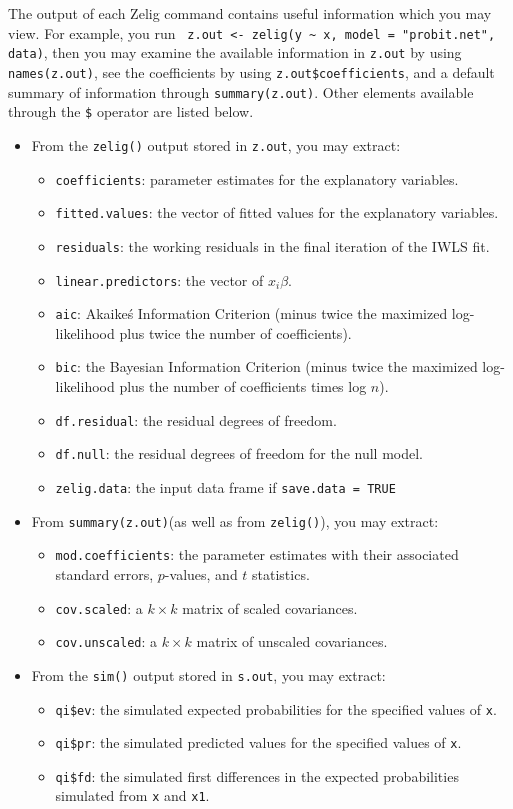 The output of each Zelig command contains useful information which you may view. For example, you run \verb{ z.out <- zelig(y ~ x, model = "probit.net", data){, then you may examine the available information in {\tt z.out} by using {\tt names(z.out)}, see the coefficients by using {\tt z.out\$coefficients}, and a default summary of information through {\tt summary(z.out)}. Other elements available through the {\tt \$} operator are listed below. 
\begin{itemize}
\item From the {\tt zelig()} output stored in {\tt  z.out}, you may extract:
\begin{itemize}
\item {\tt coefficients}: parameter estimates for the explanatory variables.
\item {\tt fitted.values}: the vector of fitted values for the explanatory variables.
\item {\tt residuals}: the working residuals in the final iteration of the IWLS fit. 
\item {\tt linear.predictors}: the vector of $x_{i}\beta$.
\item {\tt aic}: Akaike\'s Information Criterion (minus twice the maximized log-likelihood plus twice the number of coefficients).
\item {\tt bic}: the Bayesian Information Criterion (minus twice the maximized log-likelihood plus the number of coefficients times log $n$).
\item {\tt df.residual}: the residual degrees of freedom.
\item {\tt df.null}: the residual degrees of freedom for the null model. 
\item {\tt zelig.data}: the input data frame if {\tt save.data = TRUE} 

\end{itemize}
\item From {\tt summary(z.out)}(as well as from {\tt zelig()}), you may extract:
\begin{itemize}
\item {\tt mod.coefficients}: the parameter estimates with their associated standard errors, $p$-values, and $t$ statistics. 
\item {\tt cov.scaled}: a $k \times k$ matrix of scaled covariances.
\item {\tt cov.unscaled}: a $k \times k$ matrix of unscaled covariances. 
\end{itemize}
\item From the {\tt sim()} output stored in {\tt s.out}, you may extract:
\begin{itemize}
\item {\tt qi\$ev}: the simulated expected probabilities for the specified values of {\tt x}.
\item {\tt qi\$pr}: the simulated predicted values for the specified values of {\tt x}.
\item {\tt qi\$fd}: the simulated first differences in the expected probabilities simulated from {\tt x} and {\tt x1}.
\end{itemize}
\end{itemize}


